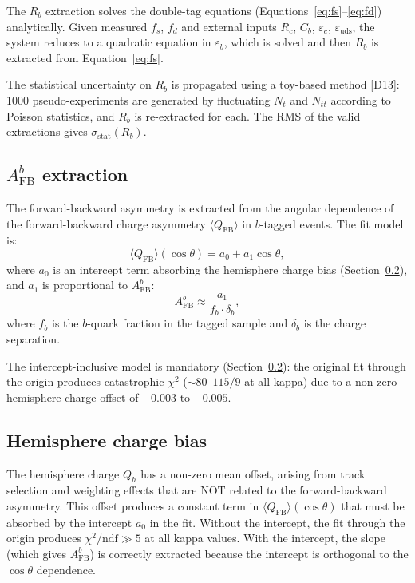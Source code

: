 \documentclass[11pt,a4paper]{article}
\begin{document}
The $R_b$ extraction solves the double-tag equations (Equations~\ref{eq:fs}--\ref{eq:fd})
analytically. Given measured $f_s$, $f_d$ and external inputs $R_c$, $C_b$,
$\varepsilon_c$, $\varepsilon_\mathrm{uds}$, the system reduces to a quadratic
equation in $\varepsilon_b$, which is solved and then $R_b$ is extracted from
Equation~\ref{eq:fs}.

The statistical uncertainty on $R_b$ is propagated using a toy-based method [D13]:
1000 pseudo-experiments are generated by fluctuating $N_t$ and $N_{tt}$ according
to Poisson statistics, and $R_b$ is re-extracted for each. The RMS of the valid
extractions gives $\sigma_\mathrm{stat}(R_b)$.

\subsection{$A_\mathrm{FB}^b$ extraction}
\label{sec:stat_afb}

The forward-backward asymmetry is extracted from the angular dependence of the
forward-backward charge asymmetry $\langle Q_\mathrm{FB} \rangle$ in $b$-tagged events.
The fit model is:
\begin{equation}
\langle Q_\mathrm{FB} \rangle(\cos\theta) = a_0 + a_1 \cos\theta,
\label{eq:qfb_fit}
\end{equation}
where $a_0$ is an intercept term absorbing the hemisphere charge bias (Section~\ref{sec:afb_bias}),
and $a_1$ is proportional to $A_\mathrm{FB}^b$:
\begin{equation}
A_\mathrm{FB}^b \approx \frac{a_1}{f_b \cdot \delta_b},
\label{eq:afb_from_slope}
\end{equation}
where $f_b$ is the $b$-quark fraction in the tagged sample and $\delta_b$ is the
charge separation.

The intercept-inclusive model is mandatory (Section~\ref{sec:afb_bias}): the original
fit through the origin produces catastrophic $\chi^2$ ($\sim 80$--$115/9$ at all kappa)
due to a non-zero hemisphere charge offset of $-0.003$ to $-0.005$.

\subsection{Hemisphere charge bias}
\label{sec:afb_bias}

The hemisphere charge $Q_h$ has a non-zero mean offset, arising from track selection
and weighting effects that are NOT related to the forward-backward asymmetry. This
offset produces a constant term in $\langle Q_\mathrm{FB} \rangle(\cos\theta)$ that
must be absorbed by the intercept $a_0$ in the fit. Without the intercept, the fit
through the origin produces $\chi^2/\mathrm{ndf} \gg 5$ at all kappa values. With
the intercept, the slope (which gives $A_\mathrm{FB}^b$) is correctly extracted because
the intercept is orthogonal to the $\cos\theta$ dependence.
\end{document}
